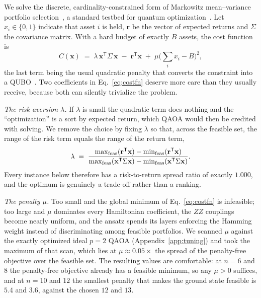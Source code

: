 \documentclass[aps,prx,preprint,superscriptaddress,nofootinbib,longbibliography]{revtex4-2}
\begin{document}
We solve the discrete, cardinality-constrained form of Markowitz mean--variance portfolio
selection~\cite{markowitz1952portfolio}, a standard testbed for quantum
optimization~\cite{egger2020finance,herman2023finance,hodson2019portfolio,buonaiuto2023portfolio}.
Let $x_i \in \{0,1\}$ indicate that asset $i$ is held, $\mathbf r$ be the vector of expected
returns and $\Sigma$ the covariance matrix. With a hard budget of exactly $B$ assets, the
cost function is
\begin{equation}
  C(\mathbf x) \;=\; \lambda\, \mathbf x^{\mathsf T}\Sigma\,\mathbf x
  \;-\; \mathbf r^{\mathsf T}\mathbf x
  \;+\; \mu\Big(\textstyle\sum_i x_i - B\Big)^{2},
  \label{eq:costfn}
\end{equation}
the last term being the usual quadratic penalty that converts the constraint into a
QUBO~\cite{lucas2014ising,glover2019qubo}. Two coefficients in Eq.~\eqref{eq:costfn} deserve
more care than they usually receive, because both can silently trivialize the problem.

\emph{The risk aversion $\lambda$.} If $\lambda$ is small the quadratic term does nothing and
the ``optimization'' is a sort by expected return, which QAOA would then be credited with
solving. We remove the choice by fixing $\lambda$ so that, across the feasible set, the range
of the risk term equals the range of the return term,
\begin{equation}
  \lambda \;=\;
  \frac{\max_{\rm feas}(\mathbf r^{\mathsf T}\mathbf x) - \min_{\rm feas}(\mathbf r^{\mathsf T}\mathbf x)}
       {\max_{\rm feas}(\mathbf x^{\mathsf T}\Sigma\mathbf x) - \min_{\rm feas}(\mathbf x^{\mathsf T}\Sigma\mathbf x)} .
  \label{eq:lambda}
\end{equation}
Every instance below therefore has a risk-to-return spread ratio of exactly $1.000$, and the
optimum is genuinely a trade-off rather than a ranking.

\emph{The penalty $\mu$.} Too small and the global minimum of Eq.~\eqref{eq:costfn} is
infeasible; too large and $\mu$ dominates every Hamiltonian coefficient, the $ZZ$ couplings
become nearly uniform, and the ansatz spends its layers enforcing the Hamming weight instead
of discriminating among feasible portfolios. We scanned $\mu$ against the exactly optimized
ideal $p=2$ QAOA (Appendix~\ref{app:tuning}) and took the maximum of that scan, which lies at
$\mu \approx 0.05\times$ the spread of the penalty-free objective over the feasible set. The
resulting values are comfortable: at $n=6$ and $8$ the penalty-free objective already has a
feasible minimum, so any $\mu>0$ suffices, and at $n=10$ and $12$ the smallest penalty that makes
the ground state feasible is $5.4$ and $3.6$, against the chosen $12$ and $13$.
\end{document}
